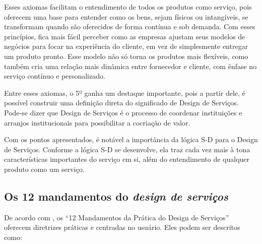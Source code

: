 Esses axiomas facilitam o entendimento de todos os produtos como serviço, pois oferecem uma base para entender como os bens, sejam físicos ou intangíveis, se transformam quando são oferecidos de forma contínua e sob demanda. Com esses princípios, fica mais fácil perceber como as empresas ajustam seus modelos de negócios para focar na experiência do cliente, em vez de simplesmente entregar um produto pronto. Esse modelo não só torna os produtos mais flexíveis, como também cria uma relação mais dinâmica entre fornecedor e cliente, com ênfase no serviço contínuo e personalizado.

Entre esses axiomas, o 5º ganha um destaque importante, pois a partir dele, é possível construir uma definição direta do significado de Design de Serviços. Pode-se dizer que Design de Serviços é o processo de coordenar instituições e arranjos institucionais para possibilitar a cocriação de valor.

Com os pontos apresentados, é notável a importância da lógica S-D para o Design de Serviços. Conforme a lógica S-D se desenvolve, ela traz cada vez mais à tona características importantes do serviço em si, além do entendimento de qualquer produto como um serviço.

\subsection{Os 12 mandamentos do \textit{design de serviços}}

De acordo com , os ``12 Mandamentos da Prática do Design de Serviços'' oferecem diretrizes práticas e centradas no usuário. Eles podem ser descritos como:

